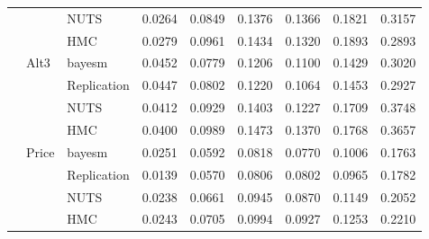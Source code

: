 \begin{tabular}{lllcccccc}
 &  & NUTS & 0.0264 & 0.0849 & 0.1376 & 0.1366 & 0.1821 & 0.3157 \\
 &  & HMC & 0.0279 & 0.0961 & 0.1434 & 0.1320 & 0.1893 & 0.2893 \\
 & Alt3 & bayesm & 0.0452 & 0.0779 & 0.1206 & 0.1100 & 0.1429 & 0.3020 \\
 &  & Replication & 0.0447 & 0.0802 & 0.1220 & 0.1064 & 0.1453 & 0.2927 \\
 &  & NUTS & 0.0412 & 0.0929 & 0.1403 & 0.1227 & 0.1709 & 0.3748 \\
 &  & HMC & 0.0400 & 0.0989 & 0.1473 & 0.1370 & 0.1768 & 0.3657 \\
 & Price & bayesm & 0.0251 & 0.0592 & 0.0818 & 0.0770 & 0.1006 & 0.1763 \\
 &  & Replication & 0.0139 & 0.0570 & 0.0806 & 0.0802 & 0.0965 & 0.1782 \\
 &  & NUTS & 0.0238 & 0.0661 & 0.0945 & 0.0870 & 0.1149 & 0.2052 \\
 &  & HMC & 0.0243 & 0.0705 & 0.0994 & 0.0927 & 0.1253 & 0.2210 \\
\bottomrule
\end{tabular}
